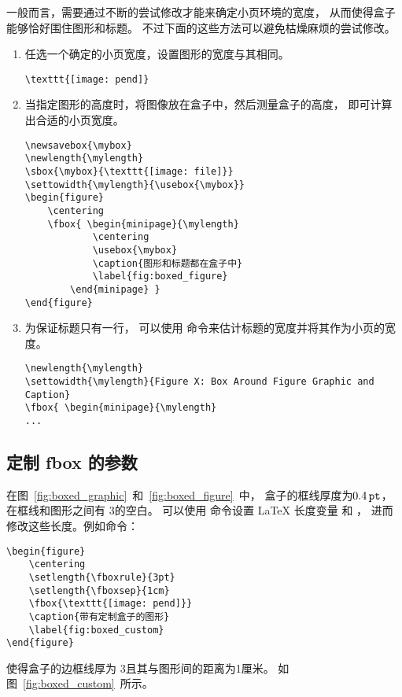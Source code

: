 一般而言，需要通过不断的尝试修改才能来确定小页环境的宽度，
从而使得盒子能够恰好围住图形和标题。
不过下面的这些方法可以避免枯燥麻烦的尝试修改。
\begin{enumerate}
	\item 任选一个确定的小页宽度，设置图形的宽度与其相同。
\begin{lstlisting}
\texttt{[image: pend]}
\end{lstlisting}
	\item 当指定图形的高度时，将图像放在盒子中，然后测量盒子的高度，
	即可计算出合适的小页宽度。
\begin{lstlisting}
\newsavebox{\mybox}
\newlength{\mylength}
\sbox{\mybox}{\texttt{[image: file]}}
\settowidth{\mylength}{\usebox{\mybox}}
\begin{figure}
	\centering
	\fbox{ \begin{minipage}{\mylength}
			\centering
			\usebox{\mybox}
			\caption{图形和标题都在盒子中}
			\label{fig:boxed_figure}
		\end{minipage} }
\end{figure}
\end{lstlisting}

	\item 为保证标题只有一行，
	可以使用  命令来估计标题的宽度并将其作为小页的宽度。
\begin{lstlisting}[xleftmargin=0pt]
\newlength{\mylength} 
\settowidth{\mylength}{Figure X: Box Around Figure Graphic and Caption} 
\fbox{ \begin{minipage}{\mylength} 
...
\end{lstlisting}
\end{enumerate}

\subsection{定制 fbox 的参数} \label{ssec:customizefbox}

在图~\ref{fig:boxed_graphic}~和~\ref{fig:boxed_figure}~中，
盒子的框线厚度为$0.4\,\mathtt{pt}$，在框线和图形之间有 3\pt 的空白。
可以使用  命令设置 \LaTeX{} 长度变量  和 ，
进而修改这些长度。例如命令：
\begin{lstlisting}
\begin{figure}
	\centering
	\setlength{\fboxrule}{3pt}
	\setlength{\fboxsep}{1cm}
	\fbox{\texttt{[image: pend]}}
	\caption{带有定制盒子的图形}
	\label{fig:boxed_custom}
\end{figure}
\end{lstlisting}
使得盒子的边框线厚为 3\pt 且其与图形间的距离为1厘米。
如图~\ref{fig:boxed_custom}~所示。

